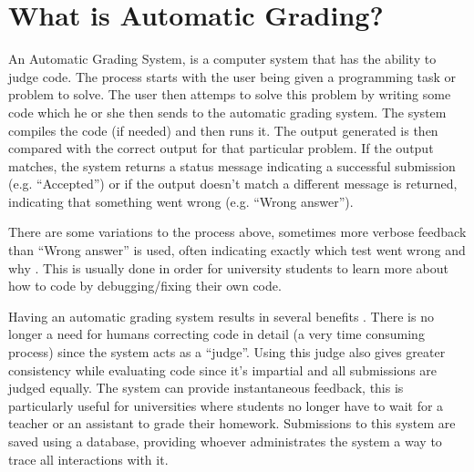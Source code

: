 \section{What is Automatic Grading?}
An Automatic Grading System, is a computer system that has the ability to judge code. The process starts with the user being given a programming task or problem to solve. The user then attemps to solve this problem by writing some code which he or she then sends to the automatic grading system. The system compiles the code (if needed) and then runs it. The output generated is then compared with the correct output for that particular problem. If the output matches, the system returns a status message indicating a successful submission (e.g. ``Accepted'') or if the output doesn't match a different message is returned, indicating that something went wrong (e.g. ``Wrong answer''). 

There are some variations to the process above, sometimes more verbose feedback than ``Wrong answer'' is used, often indicating exactly which test went wrong and why \cite{Gradebot}. This is usually done in order for university students to learn more about how to code by debugging/fixing their own code.

Having an automatic grading system results in several benefits \cite{Suleman}. There is no longer a need for humans correcting code in detail (a very time consuming process) since the system acts as a ``judge''. Using this judge also gives greater consistency while evaluating code since it's impartial and all submissions are judged equally. The system can provide instantaneous feedback, this is particularly useful for universities where students no longer have to wait for a teacher or an assistant to grade their homework. Submissions to this system are saved using a database, providing whoever administrates the system a way to trace all interactions with it.
